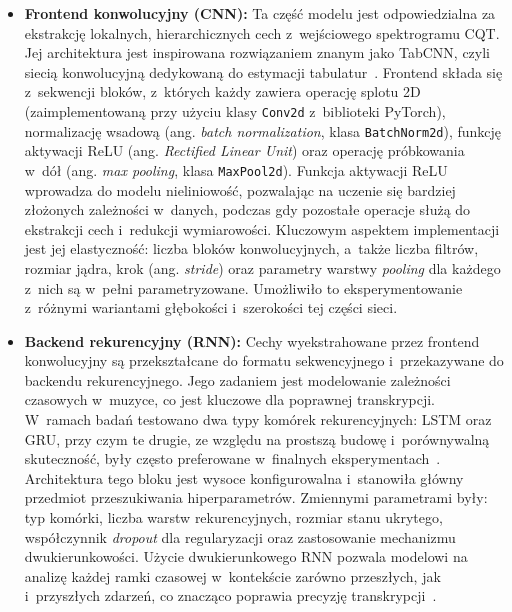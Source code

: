 \begin{itemize}
    \item \textbf{Frontend konwolucyjny (CNN):} Ta część modelu jest odpowiedzialna za ekstrakcję lokalnych, hierarchicznych cech z~wejściowego spektrogramu CQT. Jej architektura jest inspirowana rozwiązaniem znanym jako TabCNN, czyli siecią konwolucyjną dedykowaną do estymacji tabulatur~\autocite{Wiggins2019TabCNN, BurletHindle2017IsolatedGuitarTranscription}. Frontend składa się z~sekwencji bloków, z~których każdy zawiera operację splotu 2D (zaimplementowaną przy użyciu klasy \texttt{Conv2d} z~biblioteki PyTorch), normalizację wsadową (ang. \textit{batch normalization}, klasa \texttt{BatchNorm2d}), funkcję aktywacji ReLU (ang. \textit{Rectified Linear Unit}) oraz operację próbkowania w~dół (ang. \textit{max pooling}, klasa \texttt{MaxPool2d}). Funkcja aktywacji ReLU wprowadza do modelu nieliniowość, pozwalając na uczenie się bardziej złożonych zależności w~danych, podczas gdy pozostałe operacje służą do ekstrakcji cech i~redukcji wymiarowości. Kluczowym aspektem implementacji jest jej elastyczność: liczba bloków konwolucyjnych, a~także liczba filtrów, rozmiar jądra, krok (ang. \textit{stride}) oraz parametry warstwy \textit{pooling} dla każdego z~nich są w~pełni parametryzowane. Umożliwiło to eksperymentowanie z~różnymi wariantami głębokości i~szerokości tej części sieci.

    \item \textbf{Backend rekurencyjny (RNN):} Cechy wyekstrahowane przez frontend konwolucyjny są przekształcane do formatu sekwencyjnego i~przekazywane do backendu rekurencyjnego. Jego zadaniem jest modelowanie zależności czasowych w~muzyce, co jest kluczowe dla poprawnej transkrypcji. W~ramach badań testowano dwa typy komórek rekurencyjnych: LSTM oraz GRU, przy czym te drugie, ze względu na prostszą budowę i~porównywalną skuteczność, były często preferowane w~finalnych eksperymentach~\autocite{Chung2014GRU}. Architektura tego bloku jest wysoce konfigurowalna i~stanowiła główny przedmiot przeszukiwania hiperparametrów. Zmiennymi parametrami były: typ komórki, liczba warstw rekurencyjnych, rozmiar stanu ukrytego, współczynnik \textit{dropout} dla regularyzacji oraz zastosowanie mechanizmu dwukierunkowości. Użycie dwukierunkowego RNN pozwala modelowi na analizę każdej ramki czasowej w~kontekście zarówno przeszłych, jak i~przyszłych zdarzeń, co znacząco poprawia precyzję transkrypcji~\autocite{Hawthorne2018Onsets, KlapuriDavy2006SignalProcessing}.


\end{itemize}

